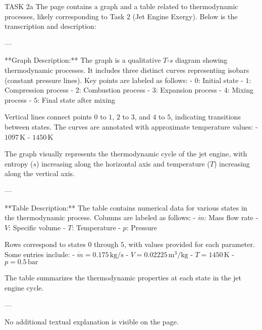 TASK 2a  
The page contains a graph and a table related to thermodynamic processes, likely corresponding to Task 2 (Jet Engine Exergy). Below is the transcription and description:

---

**Graph Description:**  
The graph is a qualitative \( T \)-\( s \) diagram showing thermodynamic processes. It includes three distinct curves representing isobars (constant pressure lines). Key points are labeled as follows:  
- \( 0 \): Initial state  
- \( 1 \): Compression process  
- \( 2 \): Combustion process  
- \( 3 \): Expansion process  
- \( 4 \): Mixing process  
- \( 5 \): Final state after mixing  

Vertical lines connect points \( 0 \) to \( 1 \), \( 2 \) to \( 3 \), and \( 4 \) to \( 5 \), indicating transitions between states. The curves are annotated with approximate temperature values:  
- \( 1097 \, \text{K} \)  
- \( 1450 \, \text{K} \)  

The graph visually represents the thermodynamic cycle of the jet engine, with entropy (\( s \)) increasing along the horizontal axis and temperature (\( T \)) increasing along the vertical axis.

---

**Table Description:**  
The table contains numerical data for various states in the thermodynamic process. Columns are labeled as follows:  
- \( \dot{m} \): Mass flow rate  
- \( V \): Specific volume  
- \( T \): Temperature  
- \( p \): Pressure  

Rows correspond to states \( 0 \) through \( 5 \), with values provided for each parameter. Some entries include:  
- \( \dot{m} = 0.175 \, \text{kg/s} \)  
- \( V = 0.02225 \, \text{m}^3/\text{kg} \)  
- \( T = 1450 \, \text{K} \)  
- \( p = 0.5 \, \text{bar} \)  

The table summarizes the thermodynamic properties at each state in the jet engine cycle.

---

No additional textual explanation is visible on the page.  

